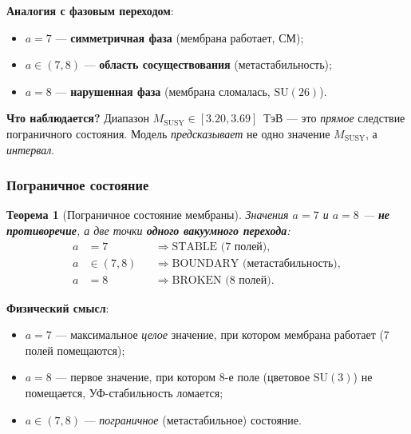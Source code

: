 \documentclass[11pt,a4paper]{article}
\newcommand{\SU}{\ensuremath{\mathrm{SU}}}
\newtheorem{theorem}{Теорема}[section]
\theoremstyle{definition}
\begin{document}
\medskip\noindent
\textbf{Аналогия с фазовым переходом}:
\begin{itemize}
    \item $a = 7$ — \textbf{симметричная фаза} (мембрана работает, СМ);
    \item $a \in (7, 8)$ — \textbf{область сосуществования} (метастабильность);
    \item $a = 8$ — \textbf{нарушенная фаза} (мембрана сломалась, $\SU(26)$).
\end{itemize}

\medskip\noindent
\textbf{Что наблюдается?}
Диапазон $M_{\text{SUSY}} \in [3.20, 3.69]$~ТэВ ---
это \emph{прямое} следствие пограничного состояния.
Модель \emph{предсказывает} не одно значение
$M_{\text{SUSY}}$, а \emph{интервал}.

\subsubsection{Пограничное состояние}

\begin{theorem}[Пограничное состояние мембраны]
\label{thm:membrane-boundary}
Значения $a = 7$ и $a = 8$ --- \textbf{не противоречие},
а две точки \textbf{одного вакуумного перехода}:
\begin{equation}
    \boxed{
    \begin{aligned}
        a &= 7 &&\Rightarrow \text{STABLE (7 полей)}, \\
        a &\in (7, 8) &&\Rightarrow \text{BOUNDARY (метастабильность)}, \\
        a &= 8 &&\Rightarrow \text{BROKEN (8 полей)}.
    \end{aligned}}
    \label{eq:membrane-boundary-states}
\end{equation}
\end{theorem}

\medskip\noindent
\textbf{Физический смысл}:
\begin{itemize}
    \item $a = 7$ --- максимальное \emph{целое} значение,
          при котором мембрана работает (7 полей помещаются);
    \item $a = 8$ --- первое значение, при котором 8-е поле
          (цветовое $\SU(3)$) не помещается, УФ-стабильность ломается;
    \item $a \in (7, 8)$ --- \emph{пограничное} (метастабильное)
          состояние.
\end{itemize}
\end{document}
